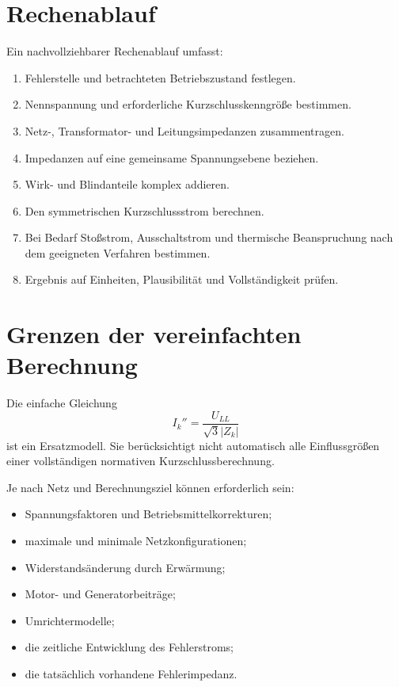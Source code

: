 \section{Rechenablauf}

Ein nachvollziehbarer Rechenablauf umfasst:
\begin{enumerate}
  \item Fehlerstelle und betrachteten Betriebszustand festlegen.
  \item Nennspannung und erforderliche Kurzschlusskenngröße bestimmen.
  \item Netz-, Transformator- und Leitungsimpedanzen zusammentragen.
  \item Impedanzen auf eine gemeinsame Spannungsebene beziehen.
  \item Wirk- und Blindanteile komplex addieren.
  \item Den symmetrischen Kurzschlussstrom berechnen.
  \item Bei Bedarf Stoßstrom, Ausschaltstrom und thermische Beanspruchung
        nach dem geeigneten Verfahren bestimmen.
  \item Ergebnis auf Einheiten, Plausibilität und Vollständigkeit prüfen.
\end{enumerate}

\section{Grenzen der vereinfachten Berechnung}

Die einfache Gleichung
\[
  I_k''=\frac{U_{LL}}{\sqrt{3}|Z_k|}
\]
ist ein Ersatzmodell. Sie berücksichtigt nicht automatisch alle
Einflussgrößen einer vollständigen normativen Kurzschlussberechnung.

Je nach Netz und Berechnungsziel können erforderlich sein:
\begin{itemize}
  \item Spannungsfaktoren und Betriebsmittelkorrekturen;
  \item maximale und minimale Netzkonfigurationen;
  \item Widerstandsänderung durch Erwärmung;
  \item Motor- und Generatorbeiträge;
  \item Umrichtermodelle;
  \item die zeitliche Entwicklung des Fehlerstroms;
  \item die tatsächlich vorhandene Fehlerimpedanz.
\end{itemize}

